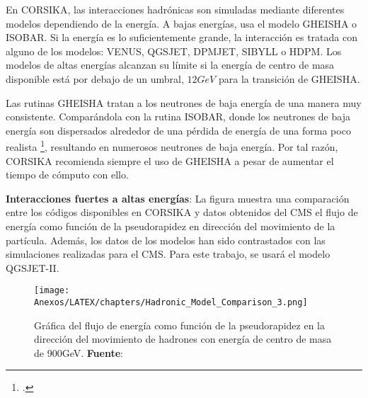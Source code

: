 En CORSIKA, las interacciones hadrónicas son simuladas mediante diferentes modelos dependiendo de la energía. A bajas energías, usa el modelo GHEISHA o ISOBAR. Si la energía es lo suficientemente grande, la interacción es tratada con alguno de los modelos: VENUS, QGSJET, DPMJET, SIBYLL o HDPM. Los modelos de altas energías  alcanzan su límite si la energía de centro de masa disponible está por debajo de  un umbral, $12 GeV$ para la transición de GHEISHA. 

Las rutinas GHEISHA tratan a los neutrones de baja energía de una manera muy consistente. Comparándola con la rutina ISOBAR, donde los neutrones de baja energía son dispersados alrededor de una pérdida de energía de una forma poco realista \footcite{Allen}, resultando en numerosos neutrones de baja energía. Por tal razón, CORSIKA recomienda siempre el uso de GHEISHA a pesar de aumentar el tiempo de cómputo con ello.

\textbf{Interacciones fuertes a altas energías}: La figura muestra una comparación entre los códigos disponibles en CORSIKA y datos obtenidos del CMS el flujo de energía como función de la pseudorapidez en dirección del movimiento de la partícula. Además, los datos de los modelos han sido contrastados con las simulaciones realizadas para el CMS. Para este trabajo, se usará el modelo QGSJET-II.


\begin{figure}[H]
\centering
\texttt{[image: Anexos/LATEX/chapters/Hadronic\_Model\_Comparison\_3.png]}
\caption[Flujo de energía para hadrones de alta energía]{Gráfica del flujo de energía como función de la pseudorapidez en la dirección del movimiento de hadrones con energía de centro de masa de 900GeV.        \textbf{Fuente}: \cite{Allen} }
        \label{fig:fig5}
\end{figure}